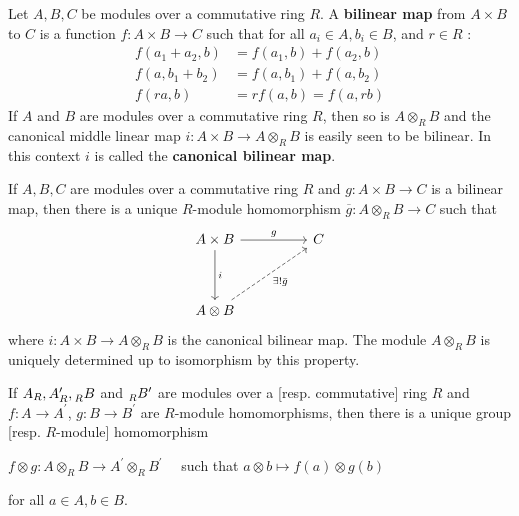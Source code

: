 \begin{definition}
    Let $A, B, C$ be modules over a commutative ring $R$. A \textbf{bilinear map} from $A \times B$ to $C$ is a function $f: A \times B \rightarrow C$ such that for all $ a_i \in A, b_i \in B$, and $r \in R$ :
    \begin{equation*}
        \begin{aligned}
            f\left(a_1+a_2, b\right) & =f\left(a_1, b\right)+f\left(a_2, b\right) \\
            f\left(a, b_1+b_2\right) & =f\left(a, b_1\right)+f\left(a, b_2\right) \\
            f(r a, b)                & =r f(a, b)=f(a, r b)
        \end{aligned}
    \end{equation*}
    If $A$ and $B$ are modules over a commutative ring $R$, then so is $A \otimes_R B$ and the canonical middle linear map $i: A \times B \rightarrow A \otimes_R B$ is easily seen to be bilinear. In this context $i$ is called the \textbf{canonical bilinear map}.
\end{definition}

\begin{theorem}
    If ${A}, B, C$ are modules over a commutative ring $R$ and ${g}: A \times B \rightarrow C$ is a bilinear map, then there is a unique $R$-module homomorphism $\overline{{g}}: A \otimes_{{R}} B \rightarrow C$ such that
    \begin{equation*}
        \begin{tikzcd}
            A \times B \arrow[rr, "g"] \arrow[dd, "i"]  & & C \\
            &   &      \\
            A \otimes B \arrow[rruu,dashed, "\exists!\bar{g}"']  &     &
        \end{tikzcd}
    \end{equation*}
    where ${i}: A \times B \rightarrow A \otimes_{{R}} B$ is the canonical bilinear map. The module ${A} \otimes_{{R}} B$ is uniquely determined up to isomorphism by this property.
\end{theorem}


\begin{proposition}
    If $A_R, A_R^{\prime}, \prescript{ }{R}{B}$ and $\prescript{ }{R}{B}^{\prime}$ are modules over a [resp. commutative] ring $R$ and ${f}: A \rightarrow A^{\prime}$, ${g}: B \rightarrow B^{\prime}$ are $R$-module homomorphisms, then there is a unique group [resp. $R$-module] homomorphism
    \begin{center}
        $f\otimes g: A \otimes_{{R}} B \rightarrow A^{\prime} \otimes_{{R}} B^{\prime}\quad $ such that ${a} \otimes {b} \mapsto {f}({a}) \otimes {g}({b})$
    \end{center}
    for all ${a} \in A, {b} \in B$.
\end{proposition}



